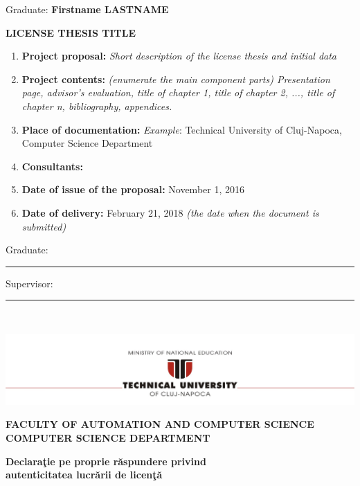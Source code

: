 \documentclass[12pt,a4paper,twoside]{report}
\renewcommand{\thesisauthor}{Firstname LASTNAME}    %
\renewcommand{\thesistitle}{LICENSE THESIS TITLE}
\newcommand{\department}{\bf FACULTY OF AUTOMATION AND COMPUTER SCIENCE\\
COMPUTER SCIENCE DEPARTMENT}
\newcommand{\utcnlogo}{\includegraphics[width=15cm]{img/tucn.jpg}}
\newcommand{\uline}[1]{\rule[0pt]{#1}{0.4pt}}
\begin{document}
\vspace{2cm}

\begin{center}
Graduate: {\bf \thesisauthor}

\vspace{1cm}

{\bf \thesistitle}
\end{center}

\vspace{1cm}

\begin{enumerate}
 \item {\bf Project proposal:} {\it Short description of the license thesis and initial data}
\item {\bf Project contents:} {\it (enumerate the main component parts) Presentation page, advisor's evaluation, title of chapter 1, title of chapter 2, ..., title of chapter n, bibliography, appendices.}
\item {\bf Place of documentation:} {\it Example}: Technical University of Cluj-Napoca, Computer Science Department
\item {\bf Consultants:}
\item {\bf Date of issue of the proposal:} November 1, 2016
\item {\bf Date of  delivery:} February 21, 2018 {\it (the date when the document is submitted)}
  \end{enumerate}
\vspace{1.2cm}

\hspace{6cm} Graduate: \uline{6cm} 

\vspace{0.5cm}
\hspace{6cm} Supervisor: \uline{6cm} 

\thispagestyle{empty}


\newpage
$ $


\thispagestyle{empty}
\newpage

\begin{center}
\utcnlogo

\department
\end{center}

\vspace{0.5cm}

\begin{center}
{\bf
Declara\c{t}ie pe proprie r\u{a}spundere privind\\ 
autenticitatea lucr\u{a}rii de licen\c{t}\u{a}}
\end{center}
\vspace{1cm}
\end{document}
